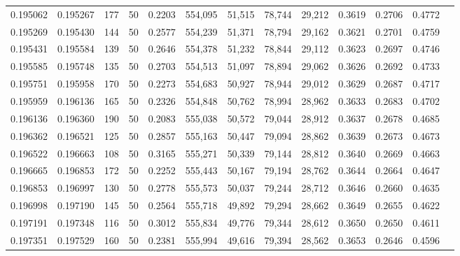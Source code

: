 \begin{tabular}{rrrrrrrrrrrrr}
0.195062 & 0.195267 &   177 &  50 &                                     0.2203 & 554,095 &  51,515 &  78,744 &  29,212 & 0.3619 & 0.2706 & 0.4772 \\
0.195269 & 0.195430 &   144 &  50 &                                     0.2577 & 554,239 &  51,371 &  78,794 &  29,162 & 0.3621 & 0.2701 & 0.4759 \\
0.195431 & 0.195584 &   139 &  50 &                                     0.2646 & 554,378 &  51,232 &  78,844 &  29,112 & 0.3623 & 0.2697 & 0.4746 \\
0.195585 & 0.195748 &   135 &  50 &                                     0.2703 & 554,513 &  51,097 &  78,894 &  29,062 & 0.3626 & 0.2692 & 0.4733 \\
0.195751 & 0.195958 &   170 &  50 &                                     0.2273 & 554,683 &  50,927 &  78,944 &  29,012 & 0.3629 & 0.2687 & 0.4717 \\
0.195959 & 0.196136 &   165 &  50 &                                     0.2326 & 554,848 &  50,762 &  78,994 &  28,962 & 0.3633 & 0.2683 & 0.4702 \\
0.196136 & 0.196360 &   190 &  50 &                                     0.2083 & 555,038 &  50,572 &  79,044 &  28,912 & 0.3637 & 0.2678 & 0.4685 \\
0.196362 & 0.196521 &   125 &  50 &                                     0.2857 & 555,163 &  50,447 &  79,094 &  28,862 & 0.3639 & 0.2673 & 0.4673 \\
0.196522 & 0.196663 &   108 &  50 &                                     0.3165 & 555,271 &  50,339 &  79,144 &  28,812 & 0.3640 & 0.2669 & 0.4663 \\
0.196665 & 0.196853 &   172 &  50 &                                     0.2252 & 555,443 &  50,167 &  79,194 &  28,762 & 0.3644 & 0.2664 & 0.4647 \\
0.196853 & 0.196997 &   130 &  50 &                                     0.2778 & 555,573 &  50,037 &  79,244 &  28,712 & 0.3646 & 0.2660 & 0.4635 \\
0.196998 & 0.197190 &   145 &  50 &                                     0.2564 & 555,718 &  49,892 &  79,294 &  28,662 & 0.3649 & 0.2655 & 0.4622 \\
0.197191 & 0.197348 &   116 &  50 &                                     0.3012 & 555,834 &  49,776 &  79,344 &  28,612 & 0.3650 & 0.2650 & 0.4611 \\
0.197351 & 0.197529 &   160 &  50 &                                     0.2381 & 555,994 &  49,616 &  79,394 &  28,562 & 0.3653 & 0.2646 & 0.4596 \\

\end{tabular}
